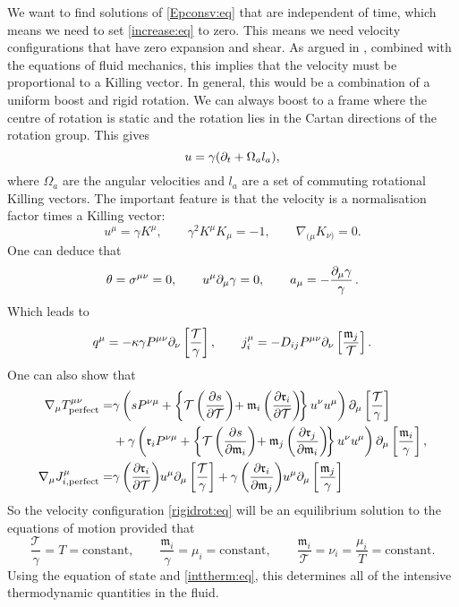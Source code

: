 \documentclass[12pt]{article}
\newcommand{\tloc}{\mathcal{T}}
\newcommand{\rl}{\mathfrak{r}}
\newcommand{\ml}{\mathfrak{m}}
\newcommand{\mg}{\mu}
\begin{document}
We want to find solutions of \eqref{Epconsv:eq} that are independent of time, which means we need to set \eqref{increase:eq} to zero. 
This means we need velocity configurations that have zero expansion and shear. 
As argued in \cite{Caldarelli:2008mv}, combined with the equations of fluid mechanics, this implies that the velocity must be proportional to a Killing vector.
In general, this would be a combination of a uniform boost and rigid rotation. 
We can always boost to a frame where the centre of rotation is static and the rotation lies in the Cartan directions of the rotation group. This gives
%
\begin{equation}\label{rigidrot:eq}
  u = \gamma(\partial_t + \Omega_a l_a),
\end{equation}
%
where $\Omega_a$ are the angular velocities and $l_a$ are a set of commuting rotational Killing vectors. The important feature is that the velocity is a normalisation factor times a Killing vector:
%
\begin{equation}\label{eqvel:eq}
  u^\mu = \gamma K^\mu, \qquad
  \gamma^2 K^\mu K_\mu = -1, \qquad
  \nabla_{(\mu} K_{\nu)} = 0.
\end{equation}
%
One can deduce that
%
\begin{equation}\label{rotvelder:eq}
  \theta = \sigma^{\mu\nu}=0, \qquad
  u^\mu \partial_\mu \gamma = 0, \qquad
  a_\mu = -\frac{\partial_\mu \gamma}{\gamma}\,.
\end{equation}
%
Which leads to
%
\begin{equation*}
  q^\mu = -\kappa \gamma P^{\mu\nu} \p_\nu \brk{\frac{\tloc}{\gamma}}, \qquad
  j^\mu_i = -D_{ij} P^{\mu\nu} \p_\nu \brk{\frac{\ml_j}{\tloc}}.
\end{equation*}
%
One can also show that
%
\begin{equation*}
\begin{split}
  \nabla_\mu T^{\mu\nu}_\mathrm{perfect} =&
    \gamma \prn{s P^{\nu\mu}
        + \brc{\tloc \pdiffc{s}{\tloc} + \ml_i \pdiffc{\rl_i}{\tloc}} u^\nu u^\mu}
       \p_\mu \brk{\frac{\tloc}{\gamma}}\\
   &+\gamma \prn{\rl_i P^{\nu\mu}
        + \brc{\tloc \pdiffc{s}{\ml_i} + \ml_j \pdiffc{\rl_j}{\ml_i}} u^\nu u^\mu}
       \p_\mu \brk{\frac{\ml_i}{\gamma}},\\
  \nabla_\mu J^\mu_{i,\text{perfect}} =&
   \gamma \pdiffc{\rl_i}{\tloc} u^\mu\p_\mu \brk{\frac{\tloc}{\gamma}}
   + \gamma \pdiffc{\rl_i}{\ml_j} u^\mu\p_\mu \brk{\frac{\ml_j}{\gamma}}
\end{split}
\end{equation*}
%
So the velocity configuration \eqref{rigidrot:eq} will be an equilibrium solution to the equations of motion provided that
%
\begin{equation}\label{rotsol:eq}
  \frac{\tloc}{\gamma} = T = \text{constant}, \qquad
  \frac{\ml_i}{\gamma} = \mg_i = \text{constant}, \qquad
  \frac{\ml_i}{\tloc} = \nu_i = \frac{\mg_i}{T} = \text{constant}.
\end{equation}
%
Using the equation of state and \eqref{inttherm:eq}, this determines all of the intensive thermodynamic quantities in the fluid.
\end{document}
